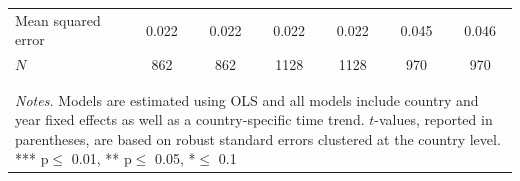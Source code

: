 \documentclass[a4paper,11pt]{article}
\begin{document}
\begin{table}[!h]
{\begin{tabular}{@{\extracolsep{6pt}}lcccccc}
Mean squared error            & 0.022       & 0.022     & 0.022      & 0.022    & 0.045   & 0.046\\
$N$                           & 862         & 862       & 1128       & 1128     & 970     & 970\\
\\[-1.8ex]\hline 
\hline \\[-1.8ex]
\multicolumn{7}{p{15cm}}{\textit{Notes.} Models are estimated using OLS and all models include country and year fixed effects as well as a country-specific time trend. $t$-values, reported in parentheses, are based on robust standard errors clustered at the country level. *** p$\leq$ 0.01, ** p$\leq$ 0.05, *$\leq$ 0.1}
    \end{tabular}}
\end{table}
\end{document}
